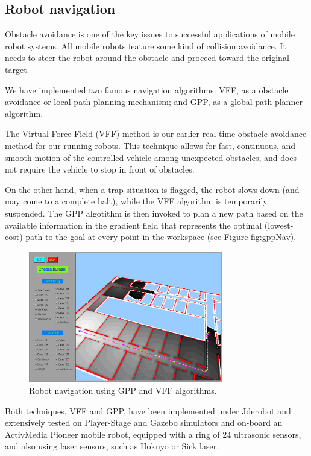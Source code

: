 \documentclass[twocolumn]{svjour3}          %
\begin{document}
\subsection{Robot navigation}

Obstacle avoidance is one of the key issues to successful applications of mobile robot systems. All mobile robots feature some kind of collision avoidance. It needs to steer the robot around the obstacle and proceed toward the original target.

We have implemented two famous navigation algorithms: VFF, as a obstacle avoidance or local path planning mechanism; and GPP, as a global path planner algorithm.

The Virtual Force Field (VFF) method is our earlier real-time obstacle avoidance method for our running robots. This technique allows for fast, continuous, and smooth motion of the controlled vehicle among unexpected obstacles, and does not require the vehicle to stop in front of obstacles.

On the other hand, when a trap-situation is flagged, the robot slows down (and may come to a complete halt),
while the VFF algorithm is temporarily suspended. The GPP algotithm is then invoked to plan a new path based on the available information in the gradient field that represents the optimal (lowest-cost) path to the goal at every point in the workspace (see Figure {fig:gppNav}).

\begin{figure}[h!]
  \includegraphics[width=8.5cm]{figs/gppNav.png}
\caption{Robot navigation using GPP and VFF algorithms.}
\label{fig:gppNav}
\end{figure}

Both techniques, VFF and GPP, have been implemented under Jderobot and extensively tested on Player-Stage and Gazebo simulators and on-board an ActivMedia Pioneer mobile robot, equipped with a ring of 24 ultrasonic sensors, and also using laser sensors, such as Hokuyo or Sick laser.
\end{document}
